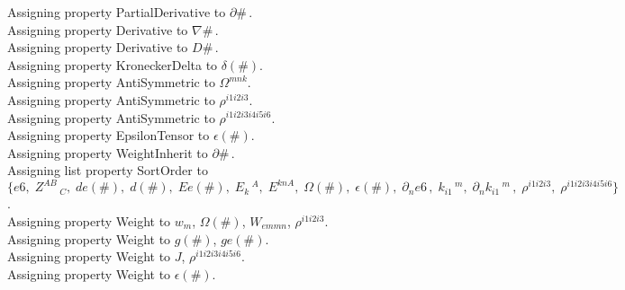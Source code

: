 \documentclass[11pt]{article}
\begin{document}
Assigning property PartialDerivative to $\partial{\#}\, $.
\\
Assigning property Derivative to $\nabla{\#}\, $.
\\
Assigning property Derivative to $D{\#}\, $.
\\
Assigning property KroneckerDelta to $\delta(\#)$.
\\
Assigning property AntiSymmetric to ${\Omega}^{m n k}$.
\\
Assigning property AntiSymmetric to ${\rho}^{i1 i2 i3}$.
\\
Assigning property AntiSymmetric to ${\rho}^{i1 i2 i3 i4 i5 i6}$.
\\
Assigning property EpsilonTensor to $\epsilon(\#)$.
\\
Assigning property WeightInherit to $\partial{\#}\, $.
\\
Assigning list property SortOrder to $\{e6,\; {Z}^{A B}\,_{C},\; de(\#),\; d(\#),\; Ee(\#),\; {E}_{k}\,^{A},\; {E}^{k n A},\; \Omega(\#),\; \epsilon(\#),\; {\partial}_{n}{e6}\, ,\; {k}_{i1}\,^{m},\; {\partial}_{n}{{k}_{i1}\,^{m}}\, ,\; {\rho}^{i1 i2 i3},\; {\rho}^{i1 i2 i3 i4 i5 i6}\}$.
\\
Assigning property Weight to ${w}_{m}$, $\Omega(\#)$, ${W}_{em m n}$, ${\rho}^{i1 i2 i3}$.
\\
Assigning property Weight to $g(\#)$, $ge(\#)$.
\\
Assigning property Weight to $J$, ${\rho}^{i1 i2 i3 i4 i5 i6}$.
\\
Assigning property Weight to $\epsilon(\#)$.
\\
\end{document}
